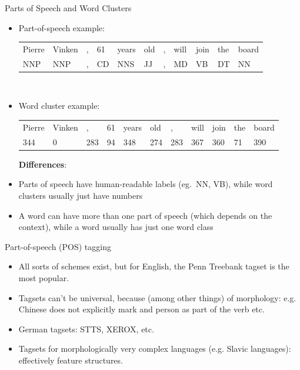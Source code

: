 \documentclass[xcolor=pdftex,x11names,table,hyperref]{beamer}
\begin{document}
\begin{frame}{Parts of Speech and Word Clusters}
\begin{itemize}
	\item Part-of-speech example: \\[0.7em]
		\begin{scriptsize}
		\begin{tabular}{lllllllllll}
			Pierre & Vinken & , & 61 & years & old & , & will & join & the & board \\
			NNP & NNP & , & CD & NNS & JJ & , & MD & VB & DT & NN \\
		\end{tabular}
	\end{scriptsize} \\[1.0em]

	\item Word cluster example: \\[0.7em]
		\begin{scriptsize}
		\begin{tabular}{lllllllllll}
			Pierre & Vinken & , & 61 & years & old & , & will & join & the & board \\
			344 & 0 & 283 & 94 & 348 & 274 & 283 & 367 & 360 & 71 & 390 \\[0.8em]
		\end{tabular}
		\end{scriptsize}
	\pause
	\hspace*{-1.5em}\textbf{Differences}:
	\item Parts of speech have human-readable labels (eg.\ NN, VB), while word clusters usually just have numbers
	\item A word can have more than one part of speech (which depends on the context), while a word usually has just one word class
\end{itemize}
\end{frame}

\begin{frame}{Part-of-speech (POS) tagging}
  \begin{itemize}
  \item All sorts of schemes exist, but for English, the Penn Treebank tagset is the most popular.\pause
  \item Tagsets can't be universal, because (among other things) of morphology: e.g. Chinese does not explicitly mark and person as part of the verb etc.\pause
  \item German tagsets: STTS, XEROX, etc.\pause
  \item Tagsets for morphologically very complex languages (e.g. Slavic languages): effectively feature structures.
  \end{itemize}
\end{frame}
\end{document}
